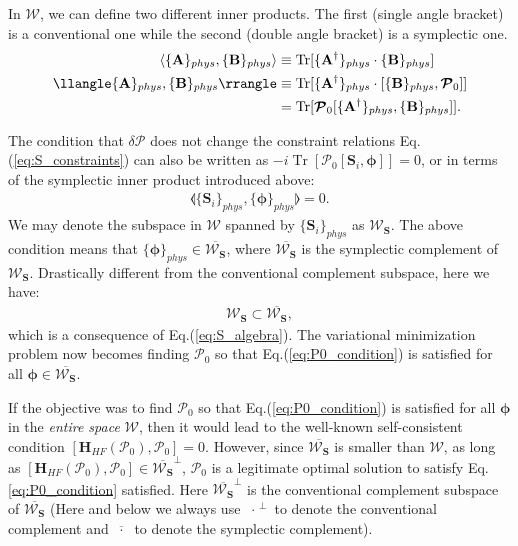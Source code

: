 \begin{subappendices}
In $\boldsymbol{\mathcal W}$, we can define two different inner products. The first (single angle bracket) is a conventional one while the second (double angle bracket) is a symplectic one. 
\begin{align}
\langle \{\mathbf A\}_{phys},\{\mathbf B\}_{phys}\rangle &\equiv\mathop{\mathrm{Tr}}[ \{\mathbf A^\dagger\}_{phys}\cdot \{\mathbf B\}_{phys}]\notag\\
\llangle\{\mathbf A\}_{phys},\{\mathbf B\}_{phys}\rrangle &\equiv\mathop{\mathrm{Tr}}[ \{\mathbf A^\dagger\}_{phys}\cdot [ \{\mathbf B\}_{phys},\boldsymbol{\mathcal P}_0]]\notag\\
&=\mathop{\mathrm{Tr}}[\boldsymbol{\mathcal P}_0 [ \{\mathbf A^\dagger\}_{phys},\{\mathbf B\}_{phys}]].
\end{align}

The condition that $\delta \boldsymbol{\mathcal P}$ does not change the constraint relations Eq.(\ref{eq:S_constraints}) can also be written as $-i\mathop{\mathrm{Tr}}[\boldsymbol{\mathcal P}_0[\mathbf S_i,\boldsymbol{\phi}]]=0$, or in terms of the symplectic inner product introduced above:
\begin{align}
\llangle\{\mathbf S_i\}_{phys},\{\boldsymbol\phi\}_{phys}\rrangle=0.
\end{align}
We may denote the subspace in $\boldsymbol{\mathcal W}$ spanned by $\{\mathbf S_i\}_{phys}$ as $\boldsymbol{\mathcal W}_{\mathbf S}$. The above condition means that $\{\boldsymbol\phi\}_{phys}\in \overline{\boldsymbol{\mathcal W}_{\mathbf S}}$, where $\overline{\boldsymbol{\mathcal W}_{\mathbf S}}$ is the symplectic complement of $\boldsymbol{\mathcal W}_{\mathbf S}$. Drastically different from the conventional complement subspace, here we have:
\begin{align}
\boldsymbol{\mathcal W}_{\mathbf S} \subset \overline{\boldsymbol{\mathcal W}_{\mathbf S}},
\end{align}
which is a consequence of Eq.(\ref{eq:S_algebra}). The variational minimization problem now becomes finding $\boldsymbol{\mathcal P}_0$ so that Eq.(\ref{eq:P0_condition}) is satisfied for all $\boldsymbol\phi\in\overline{\boldsymbol{\mathcal W}_{\mathbf S}}$. 

If the objective was to find $\boldsymbol{\mathcal P}_0$ so that Eq.(\ref{eq:P0_condition}) is satisfied for all $\boldsymbol\phi$ in the \emph{entire space} $\boldsymbol{\mathcal W}$, then it would lead to the well-known self-consistent condition $[\mathbf H_{HF}(\boldsymbol{\mathcal P}_0),\boldsymbol{\mathcal P}_0]=0$. However, since $\overline{\boldsymbol{\mathcal W}_{\mathbf S}}$ is smaller than $\boldsymbol{\mathcal W}$, as long as $[\mathbf H_{HF}(\boldsymbol{\mathcal P}_0),\boldsymbol{\mathcal P}_0]\in \overline{\boldsymbol{\mathcal W}_{\mathbf S}}^\perp$, $\boldsymbol{\mathcal P}_0$ is a legitimate optimal solution to satisfy Eq.\eqref{eq:P0_condition} satisfied. Here $\overline{\boldsymbol{\mathcal W}_{\mathbf S}}^\perp$ is the conventional complement subspace of $\overline{\boldsymbol{\mathcal W}_{\mathbf S}}$ (Here and below we always use ${\;\cdot\;}^\perp$ to denote the conventional complement and $\overline{\;\cdot\;}$ to denote the symplectic complement).


\end{subappendices}
